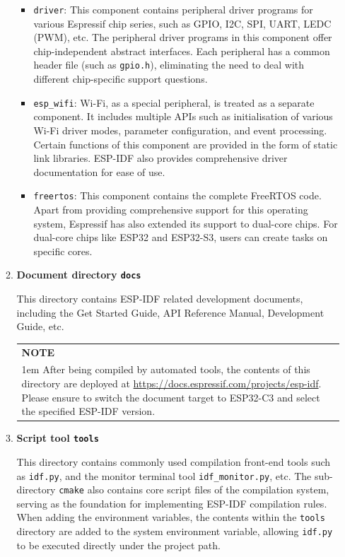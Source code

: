 \documentclass[a4paper,12pt,openany]{book}
\newcommand{\secnote}[2][NOTE]{ %
\vspace{6pt}
\begin{tabular}{b{0.93\textwidth}}
\hline
\fontfamily{phv}\selectfont \textbf{#1}\\
\leftskip 1em #2\\
\hline
\end{tabular}
}
\begin{document}
\begin{enumerate}[label=(\arabic*),leftmargin=2em]
\begin{enumerate}[label=\textbf{\alph*.},leftmargin=0em]
        \begin{itemize}[leftmargin=1em]
            \item \verb|driver|: This component contains peripheral driver programs for various Espressif chip series, such as GPIO, I2C, SPI, UART, LEDC (PWM), etc. The peripheral driver programs in this component offer chip-independent abstract interfaces. Each peripheral has a common header file (such as \verb|gpio.h|), eliminating the need to deal with different chip-specific support questions.
            \item \verb|esp_wifi|: Wi-Fi, as a special peripheral, is treated as a separate component. It includes multiple APIs such as initialisation of various Wi-Fi driver modes, parameter configuration, and event processing. Certain functions of this component are provided in the form of static link libraries. ESP-IDF also provides comprehensive driver documentation for ease of use.
            \item \verb|freertos|: This component contains the complete FreeRTOS code. Apart from providing comprehensive support for this operating system, Espressif has also extended its support to dual-core chips. For dual-core chips like ESP32 and ESP32-S3, users can create tasks on specific cores.
        \end{itemize}

        \item \textbf{Document directory \texttt{docs}}

        This directory contains ESP-IDF related development documents, including the Get Started Guide, API Reference Manual, Development Guide, etc.

        \secnote{After being compiled by automated tools, the contents of this directory are deployed at \url{https://docs.espressif.com/projects/esp-idf}. Please ensure to switch the document target to ESP32-C3 and select the specified ESP-IDF version.}

        \item \textbf{Script tool \texttt{tools}}

        This directory contains commonly used compilation front-end tools such as \verb|idf.py|, and the monitor terminal tool \verb|idf_monitor.py|, etc. The sub-directory \verb|cmake| also contains core script files of the compilation system, serving as the foundation for implementing ESP-IDF compilation rules. When adding the environment variables, the contents within the \verb|tools| directory are added to the system environment variable, allowing \verb|idf.py| to be executed directly under the project path.


\end{enumerate}
\end{enumerate}
\end{document}
